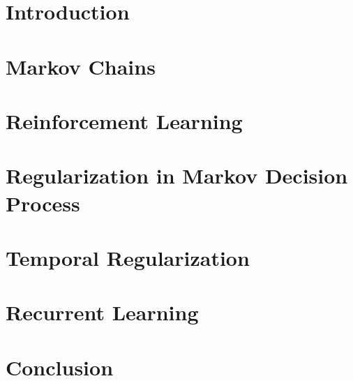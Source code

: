 \documentclass[12pt, oneside, extrafontsizes]{memoir}  %
\begin{document}
\clearpage
{}
\chapter{Introduction}


\chapter{Markov Chains}
\label{chap:markov}


\chapter{Reinforcement Learning}
\label{chap:reinforcement}


\chapter{Regularization in Markov Decision Process}
\label{chap:regularization}


\chapter{Temporal Regularization}
\label{chap:temporal}



\chapter{Recurrent Learning}
\label{chap:recurrent}




\chapter{Conclusion}


%
%
\printbibliography
\end{document}
